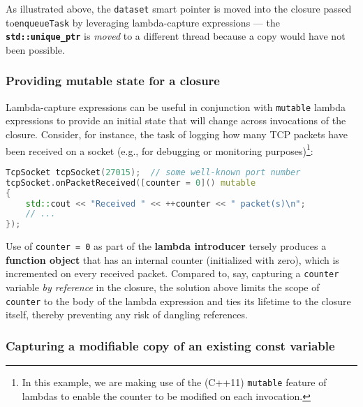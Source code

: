 \noindent As illustrated above, the \texttt{dataset} smart pointer is moved into
the closure passed to\linebreak[4] \mbox{\texttt{enqueueTask}} by leveraging lambda-capture
expressions --- the \textbf{\texttt{std::unique\_ptr}} is \emph{moved}
to a different thread because a copy would have not been possible.

\subsubsection[Providing mutable state for a closure]{Providing mutable state for a closure}\label{providing-mutable-state-for-a-closure}

Lambda-capture expressions can be useful in conjunction with
\texttt{mutable} lambda expressions to provide an initial state that
will change across invocations of the closure. Consider, for instance,
the task of logging how many TCP packets have been received on a socket
(e.g., for debugging or monitoring purposes){\cprotect\footnote{In
this example, we are making use of the (C++11) \texttt{mutable} feature
  of lambdas to enable the counter to be modified on each invocation.}}:

\begin{lstlisting}[language=C++]
TcpSocket tcpSocket(27015);  // some well-known port number
tcpSocket.onPacketReceived([counter = 0]() mutable
{
    std::cout << "Received " << ++counter << " packet(s)\n";
    // ...
});
\end{lstlisting}

\noindent Use of \texttt{counter}~\texttt{=}~\texttt{0} as part of the
\textbf{lambda introducer} tersely produces a \textbf{function object}
that has an internal counter (initialized with zero), which is
incremented on every received packet. Compared to, say, capturing a
\texttt{counter} variable \textit{by reference} in the closure, the solution
above limits the scope of \texttt{counter} to the body of the lambda
expression and ties its lifetime to the closure itself, thereby
preventing any risk of dangling references.

\subsubsection[Capturing a modifiable copy of an existing {\ttfamily const} variable]{Capturing a modifiable copy of an existing {\SubsubsecCode const} variable}\label{capturing-a-modifiable-copy-of-an-existing-const-variable}

